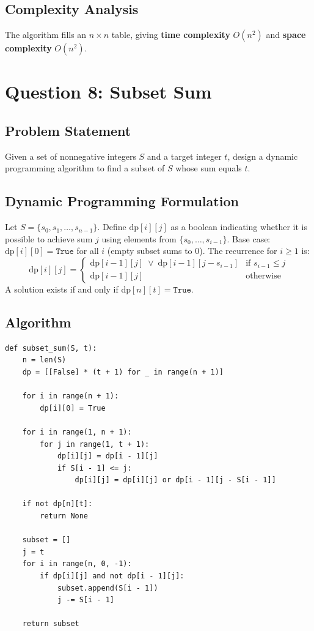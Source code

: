 \documentclass[12pt,a4paper]{article}
\begin{document}
\subsection*{Complexity Analysis}

The algorithm fills an $n \times n$ table, giving \textbf{time complexity} $O(n^2)$ and \textbf{space complexity} $O(n^2)$.

\newpage

\section*{Question 8: Subset Sum}

\subsection*{Problem Statement}
Given a set of nonnegative integers $S$ and a target integer $t$, design a dynamic programming algorithm to find a subset of $S$ whose sum equals $t$.

\subsection*{Dynamic Programming Formulation}

Let $S = \{s_0, s_1, \ldots, s_{n-1}\}$. Define $\text{dp}[i][j]$ as a boolean indicating whether it is possible to achieve sum $j$ using elements from $\{s_0, \ldots, s_{i-1}\}$. Base case: $\text{dp}[i][0] = \texttt{True}$ for all $i$ (empty subset sums to 0). The recurrence for $i \ge 1$ is:
\[
    \text{dp}[i][j] = \begin{cases}
        \text{dp}[i-1][j] \;\lor\; \text{dp}[i-1][j - s_{i-1}] & \text{if } s_{i-1} \le j \\[4pt]
        \text{dp}[i-1][j] & \text{otherwise}
    \end{cases}
\]
A solution exists if and only if $\text{dp}[n][t] = \texttt{True}$.

\subsection*{Algorithm}

\begin{verbatim}
def subset_sum(S, t):
    n = len(S)
    dp = [[False] * (t + 1) for _ in range(n + 1)]

    for i in range(n + 1):
        dp[i][0] = True

    for i in range(1, n + 1):
        for j in range(1, t + 1):
            dp[i][j] = dp[i - 1][j]
            if S[i - 1] <= j:
                dp[i][j] = dp[i][j] or dp[i - 1][j - S[i - 1]]

    if not dp[n][t]:
        return None

    subset = []
    j = t
    for i in range(n, 0, -1):
        if dp[i][j] and not dp[i - 1][j]:
            subset.append(S[i - 1])
            j -= S[i - 1]

    return subset
\end{verbatim}
\end{document}
